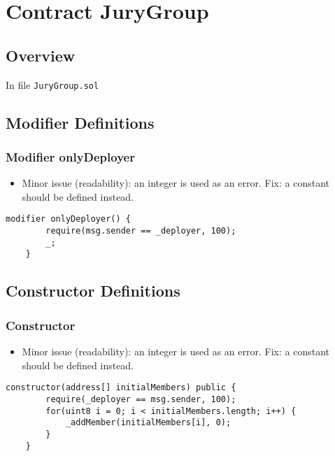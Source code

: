 
\chapter{Contract JuryGroup}

\minitoc

\section{Overview}


In file {\tt JuryGroup.sol}

\section{Modifier Definitions}


\subsection{Modifier onlyDeployer}

\begin{itemize}
\item Minor issue (readability): an integer is used as an error. Fix:
  a constant should be defined instead.
\end{itemize}

\begin{lstlisting}[firstnumber=6]
    modifier onlyDeployer() {
        require(msg.sender == _deployer, 100);
        _;
    }
\end{lstlisting}

\section{Constructor Definitions}


\subsection{Constructor}

\begin{itemize}
\item Minor issue (readability): an integer is used as an error. Fix:
  a constant should be defined instead.
\end{itemize}

\begin{lstlisting}[firstnumber=17]
    constructor(address[] initialMembers) public {
        require(_deployer == msg.sender, 100);
        for(uint8 i = 0; i < initialMembers.length; i++) {
            _addMember(initialMembers[i], 0);
        }
    }
\end{lstlisting}

